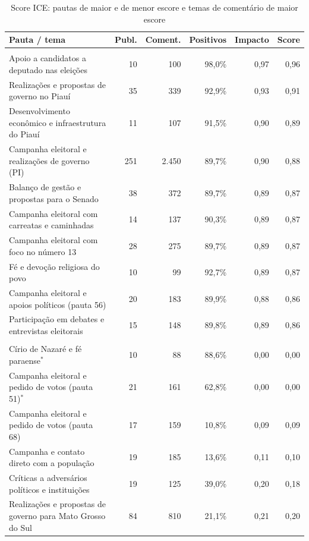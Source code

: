 \begin{table}[htb]
\centering
\caption{Score ICE: pautas de maior e de menor escore e temas de comentário de maior escore}
\label{tab:ice}
\scriptsize\setlength{\tabcolsep}{3pt}
\begin{tabular}{>{\raggedright\arraybackslash}p{7.4cm}rrrrr}
\toprule
\textbf{Pauta / tema} & \textbf{Publ.} & \textbf{Coment.} & \textbf{Positivos} & \textbf{Impacto} & \textbf{Score} \\
\midrule
\multicolumn{6}{l}{\emph{Pautas de maior escore (ao menos dez publicações)}} \\
Apoio a candidatos a deputado nas eleições & 10 & 100 & 98,0\% & 0,97 & 0,96 \\
Realizações e propostas de governo no Piauí & 35 & 339 & 92,9\% & 0,93 & 0,91 \\
Desenvolvimento econômico e infraestrutura do Piauí & 11 & 107 & 91,5\% & 0,90 & 0,89 \\
Campanha eleitoral e realizações de governo (PI) & 251 & 2.450 & 89,7\% & 0,90 & 0,88 \\
Balanço de gestão e propostas para o Senado & 38 & 372 & 89,7\% & 0,89 & 0,87 \\
Campanha eleitoral com carreatas e caminhadas & 14 & 137 & 90,3\% & 0,89 & 0,87 \\
Campanha eleitoral com foco no número 13 & 28 & 275 & 89,7\% & 0,89 & 0,87 \\
Fé e devoção religiosa do povo & 10 & 99 & 92,7\% & 0,89 & 0,87 \\
Campanha eleitoral e apoios políticos (pauta 56) & 20 & 183 & 89,9\% & 0,88 & 0,86 \\
Participação em debates e entrevistas eleitorais & 15 & 148 & 89,8\% & 0,89 & 0,86 \\
\midrule
\multicolumn{6}{l}{\emph{Pautas de menor escore (ao menos dez publicações)}} \\
Círio de Nazaré e fé paraense$^{*}$ & 10 & 88 & 88,6\% & 0,00 & 0,00 \\
Campanha eleitoral e pedido de votos (pauta 51)$^{*}$ & 21 & 161 & 62,8\% & 0,00 & 0,00 \\
Campanha eleitoral e pedido de votos (pauta 68) & 17 & 159 & 10,8\% & 0,09 & 0,09 \\
Campanha e contato direto com a população & 19 & 185 & 13,6\% & 0,11 & 0,10 \\
Críticas a adversários políticos e instituições & 19 & 125 & 39,0\% & 0,20 & 0,18 \\
Realizações e propostas de governo para Mato Grosso do Sul & 84 & 810 & 21,1\% & 0,21 & 0,20 \\

\end{tabular}
\end{table}
